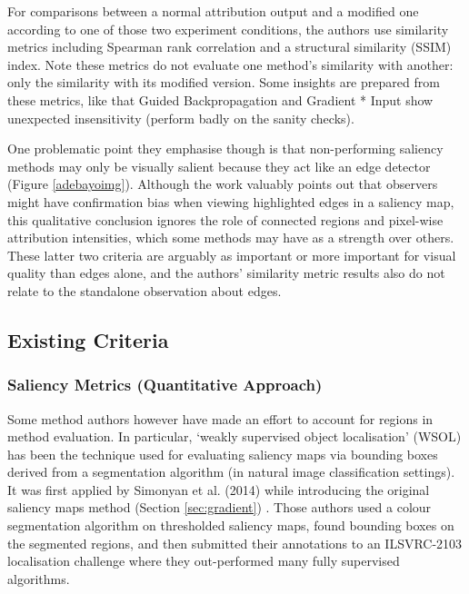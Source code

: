 \documentclass[main]{subfiles}
\begin{document}
For comparisons between a normal attribution output and a modified one according to one of those two experiment conditions, the authors use similarity metrics including Spearman rank correlation and a structural similarity (SSIM) index. Note these metrics do not evaluate one method's similarity with another: only the similarity with its modified version. Some insights are prepared from these metrics, like that Guided Backpropagation and Gradient * Input show unexpected insensitivity (perform badly on the sanity checks). 


One problematic point they emphasise though is that non-performing saliency methods may only be visually salient because they act like an edge detector (Figure \ref{adebayoimg}). Although the work valuably points out that observers might have confirmation bias when viewing highlighted edges in a saliency map, this qualitative conclusion ignores the role of connected regions and pixel-wise attribution intensities, which some methods may have as a strength over others. These latter two criteria are arguably as important or more important for visual quality than edges alone, and the authors' similarity metric results also do not relate to the standalone observation about edges.




\subsection{Existing Criteria} \label{sec:existing_criteria}




\subsubsection{Saliency Metrics (Quantitative Approach)}

Some method authors however have made an effort to account for regions in method evaluation. In particular, `weakly supervised object localisation' (WSOL) has been the technique used for evaluating saliency maps via bounding boxes derived from a segmentation algorithm (in natural image classification settings). It was first applied by Simonyan et al. (2014) while introducing the original saliency maps method (Section \ref{sec:gradient}) \cite{saliencyII} . Those authors used a colour segmentation algorithm on thresholded saliency maps, found bounding boxes on the segmented regions, and then submitted their annotations to an ILSVRC-2103 localisation challenge where they out-performed many fully supervised algorithms. 
\end{document}

